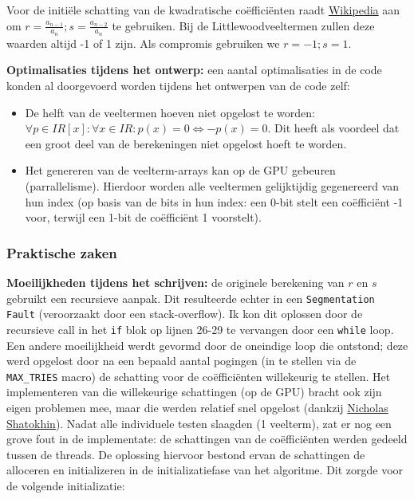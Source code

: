 \documentclass{article}
\begin{document}
Voor de initi\"ele schatting van de kwadratische co\"effici\"enten raadt \href{https://en.wikipedia.org/wiki/Bairstow%27s_method#Example}{Wikipedia} aan om $r = \frac{a_{n-1}}{a_n}; s = \frac{a_{n-2}}{a_n}$ te gebruiken. Bij de Littlewoodveeltermen zullen deze waarden altijd -1 of 1 zijn. Als compromis gebruiken we $r = -1; s = 1$.

\textbf{Optimalisaties tijdens het ontwerp:} een aantal optimalisaties in de code konden al doorgevoerd worden tijdens het ontwerpen van de code zelf:\
\begin{itemize}
 \item De helft van de veeltermen hoeven niet opgelost te worden: $\forall p \in I\!R[x]: \forall x \in I\!R: p(x) = 0 \iff -p(x) = 0$. Dit heeft als voordeel dat een groot deel van de berekeningen niet opgelost hoeft te worden.
 \item Het genereren van de veelterm-arrays kan op de GPU gebeuren (parrallelisme). Hierdoor worden alle veeltermen gelijktijdig gegenereerd van hun index (op basis van de bits in hun index: een 0-bit stelt een co\"effici\"ent -1 voor, terwijl een 1-bit de co\"effici\"ent 1 voorstelt).
\end{itemize}

\subsubsection{Praktische zaken}
\textbf{Moeilijkheden tijdens het schrijven:} de originele berekening van $r$ en $s$ gebruikt een recursieve aanpak. Dit resulteerde echter in een \verb|Segmentation Fault| (veroorzaakt door een stack-overflow). Ik kon dit oplossen door de recursieve call in het \verb|if| blok op lijnen 26-29 te vervangen door een \verb|while| loop. Een andere moeilijkheid werdt gevormd door de oneindige loop die ontstond; deze werd opgelost door na een bepaald aantal pogingen (in te stellen via de \verb|MAX_TRIES| macro) de schatting voor de co\"effici\"enten willekeurig te stellen. Het implementeren van die willekeurige schattingen (op de GPU) bracht ook zijn eigen problemen mee, maar die werden relatief snel opgelost (dankzij \href{https://gist.github.com/NicholasShatokhin/3769635}{Nicholas Shatokhin}). Nadat alle individuele testen slaagden (1 veelterm), zat er nog een grove fout in de implementate: de schattingen van de co\"effici\"enten werden gedeeld tussen de threads. De oplossing hiervoor bestond ervan de schattingen de alloceren en initializeren in de initializatiefase van het algoritme. Dit zorgde voor de volgende initializatie:
\end{document}
